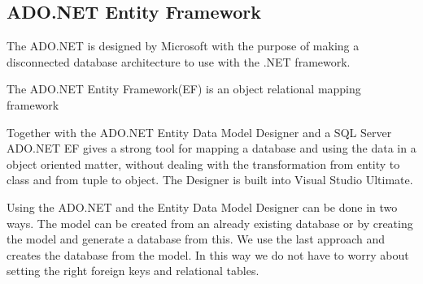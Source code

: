 \subsection{ADO.NET Entity Framework}
\label{sub:adonet}
The ADO.NET is designed by Microsoft with the purpose of making a disconnected database architecture to use with the .NET framework. %

The ADO.NET Entity Framework(EF) is an object relational mapping framework %

Together with the ADO.NET Entity Data Model Designer and a SQL Server ADO.NET EF gives a strong tool for mapping a database and using the data in a object oriented matter, without dealing with the transformation from entity to class and from tuple to object. 
The Designer is built into Visual Studio Ultimate. 

Using the ADO.NET and the Entity Data Model Designer can be done in two ways. 
The  model can be created from an already existing database or by creating the model and generate a database from this. 
We use the last approach and creates the database from the model. 
In this way we do not have to worry about setting the right foreign keys and relational tables. 







 
 
